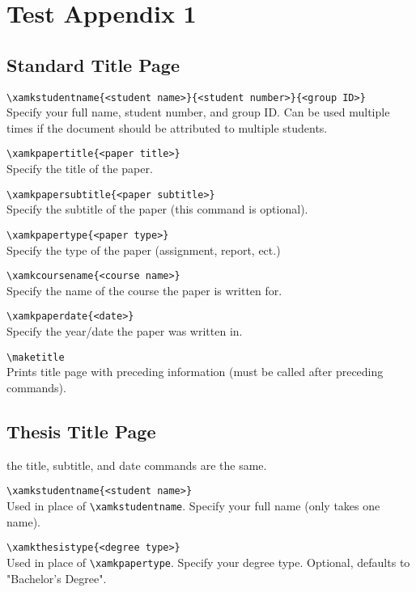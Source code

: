 \section{Test Appendix 1}

\subsection{Standard Title Page}

\verb|\xamkstudentname{<student name>}{<student number>}{<group ID>}|\\
Specify your full name, student number, and group ID.
Can be used multiple times if the document should be attributed to multiple students.

\verb|\xamkpapertitle{<paper title>}|\\
Specify the title of the paper.

\verb|\xamkpapersubtitle{<paper subtitle>}|\\
Specify the subtitle of the paper (this command is optional).

\verb|\xamkpapertype{<paper type>}|\\
Specify the type of the paper (assignment, report, ect.)

\verb|\xamkcoursename{<course name>}|\\
Specify the name of the course the paper is written for.

\verb|\xamkpaperdate{<date>}|\\
Specify the year/date the paper was written in.

\verb|\maketitle|\\
Prints title page with preceding information (must be called after preceding commands).

\subsection{Thesis Title Page}

the title, subtitle, and date commands are the same.

\verb|\xamkstudentname{<student name>}|\\
Used in place of \verb|\xamkstudentname|.
Specify your full name (only takes one name).

\verb|\xamkthesistype{<degree type>}|\\
Used in place of \verb|\xamkpapertype|.
Specify your degree type.
Optional, defaults to "Bachelor's Degree".

